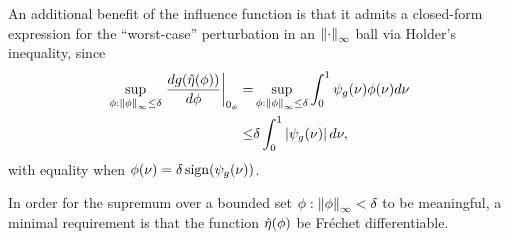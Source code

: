 An additional benefit of the influence function is that it admits a closed-form
expression for the ``worst-case'' perturbation in an $\left\Vert\cdot\right\Vert_{\infty}$ ball
via Holder's inequality, since
%
\begin{align*}
%
\sup_{\phi: \norminf{\phi} \le \delta}
    \fracat{d g(\etaopt(\phi))}{d \phi}{\phiz} =&{}
\sup_{\phi: \norminf{\phi} \le \delta}
    \int_0^1 \inflg(\nu) \phi(\nu) d\nu \\
\le&{} \delta \int_0^1 \abs{\inflg(\nu) }d\nu,
%
\end{align*}
%
with equality when $\phi(\nu) = \delta \, \mathrm{sign}(\psi_{g}(\nu))$.

In order for the supremum over a bounded set $\phi: \left\Vert\phi\right\Vert_{\infty} < \delta$
to be meaningful, a minimal requirement is that the function $\hat\eta(\phi)$
be Fr{\'e}chet differentiable.

